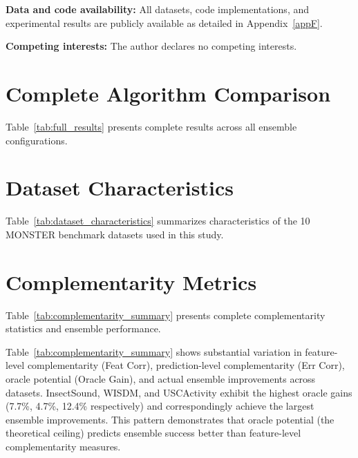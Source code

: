\documentclass[pdflatex,sn-basic]{sn-jnl}           %
\theoremstyle{thmstyleone}%
\theoremstyle{thmstyletwo}%
\theoremstyle{thmstylethree}%
\begin{document}
\bigskip

\noindent
\textbf{Data and code availability:} All datasets, code implementations, and experimental results are publicly available as detailed in Appendix~\ref{appF}.

\bigskip

\noindent
\textbf{Competing interests:} The author declares no competing interests.

\clearpage

\begin{appendices}

\section{Complete Algorithm Comparison}\label{appA}

Table~\ref{tab:full_results} presents complete results across all ensemble configurations.



\clearpage

\section{Dataset Characteristics}\label{appB}

Table~\ref{tab:dataset_characteristics} summarizes characteristics of the 10 MONSTER benchmark datasets used in this study.



\clearpage

\section{Complementarity Metrics}\label{appC}

Table~\ref{tab:complementarity_summary} presents complete complementarity statistics and ensemble performance.



Table~\ref{tab:complementarity_summary} shows substantial variation in feature-level complementarity (Feat Corr), prediction-level complementarity (Err Corr), oracle potential (Oracle Gain), and actual ensemble improvements across datasets. InsectSound, WISDM, and USCActivity exhibit the highest oracle gains (7.7\%, 4.7\%, 12.4\% respectively) and correspondingly achieve the largest ensemble improvements. This pattern demonstrates that oracle potential (the theoretical ceiling) predicts ensemble success better than feature-level complementarity measures.


\end{appendices}
\end{document}
